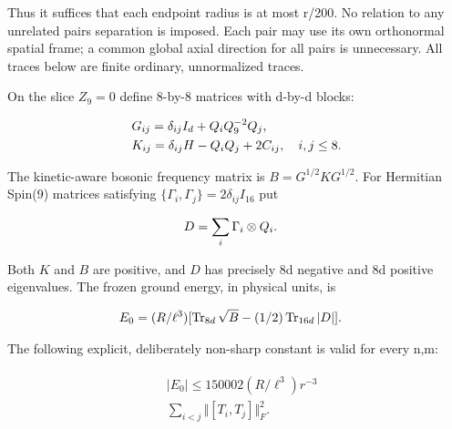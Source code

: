 Thus it suffices that each endpoint radius is at most r/200. No relation
to any unrelated pair\textquotesingle s separation is imposed. Each pair
may use its own orthonormal spatial frame; a common global axial
direction for all pairs is unnecessary. All traces below are finite
ordinary, unnormalized traces.

On the slice \(Z_{9}=0\) define 8-by-8 matrices with d-by-d blocks:

\begin{gather*}
\begin{aligned}
& G_{ij}= \delta _{ij} I_{d}+Q_{i} Q_{9}^{-2} Q_{j}, \\
& K_{ij}= \delta _{ij} H-Q_{i} Q_{j}+2 C_{ij}, \quad  i,j\le 8.
\end{aligned}\notag
\end{gather*}

The kinetic-aware bosonic frequency matrix is \(B=G^{1/2} K G^{1/2}\).
For Hermitian Spin(9) matrices satisfying
\(\{ \Gamma _{i}, \Gamma _{j}\}=2 \delta _{ij} I_{16}\) put

\begin{gather*}
\begin{aligned}
& D=\sum _{i} \Gamma _{i} \otimes  Q_{i}.
\end{aligned}\notag
\end{gather*}

Both \(K\) and \(B\) are positive, and \(D\) has precisely 8d negative
and 8d positive eigenvalues. The frozen ground energy, in physical
units, is

\begin{gather*}
\begin{aligned}
& E_{0}=(R/\ell ^{3})[\operatorname{Tr} _{8d} \sqrt{B}-(1/2)\operatorname{Tr} _{16d}\vert D\vert ].
\end{aligned}\notag
\end{gather*}

The following explicit, deliberately non-sharp constant is valid for
every n,m:

\begin{gather*}
\begin{aligned}
& \vert E_{0}\vert  \le  150002 (R/\ell ^{3}) r^{-3} \\
& \sum _{i<j}\Vert [T_{i},T_{j}]\Vert _{F}^{2}.
\end{aligned}\tag{1}
\end{gather*}

